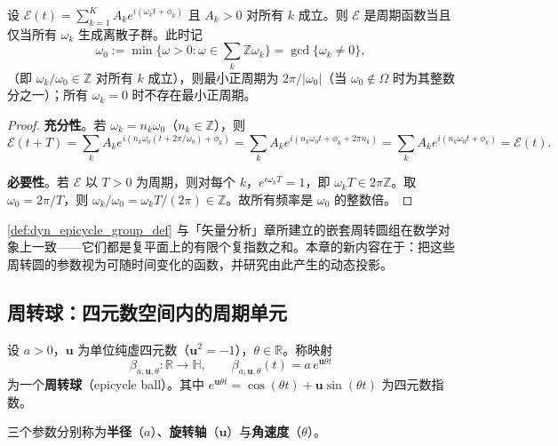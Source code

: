 \begin{proposition}[周转圆组的周期条件]\label{prop:dyn_epicycle_period_condition}
设 $\mathcal E(t)=\sum_{k=1}^{K}A_k e^{i(\omega_k t+\phi_k)}$ 且 $A_k>0$ 对所有 $k$ 成立。则 $\mathcal E$ 是周期函数当且仅当所有 $\omega_k$ 生成离散子群。此时记
\[
\omega_0:=\min\{\omega>0:\omega\in\textstyle\sum_k\mathbb{Z}\omega_k\}=\gcd\{\omega_k\ne0\},
\]
（即 $\omega_k/\omega_0\in\mathbb Z$ 对所有 $k$ 成立），则最小正周期为 $2\pi/\lvert\omega_0\rvert$（当 $\omega_0\notin\Omega$ 时为其整数分之一）；所有 $\omega_k=0$ 时不存在最小正周期。
\end{proposition}

\begin{proof}
\textbf{充分性}。若 $\omega_k=n_k\omega_0$（$n_k\in\mathbb Z$），则
\[
\mathcal E(t+T)=\sum_k A_k e^{i(n_k\omega_0(t+2\pi/\omega_0)+\phi_k)}
=\sum_k A_k e^{i(n_k\omega_0 t+\phi_k+2\pi n_k)}
=\sum_k A_k e^{i(n_k\omega_0 t+\phi_k)}=\mathcal E(t).
\]

\textbf{必要性}。若 $\mathcal E$ 以 $T>0$ 为周期，则对每个 $k$，$e^{i\omega_k T}=1$，即 $\omega_k T\in 2\pi\mathbb Z$。取 $\omega_0=2\pi/T$，则 $\omega_k/\omega_0=\omega_k T/(2\pi)\in\mathbb Z$。故所有频率是 $\omega_0$ 的整数倍。
\end{proof}

\begin{remark}[与静态模型的衔接]\label{rem:dyn_epicycle_static_link}
\cref{def:dyn_epicycle_group_def} 与「矢量分析」章所建立的嵌套周转圆组在数学对象上一致——它们都是复平面上的有限个复指数之和。本章的新内容在于：把这些周转圆的参数视为可随时间变化的函数，并研究由此产生的动态投影。
\end{remark}

\subsection{周转球：四元数空间内的周期单元}

\begin{definition}[周转球]\label{def:dyn_epicycle_ball}
设 $a>0$，$\mathbf u$ 为单位纯虚四元数（$\mathbf u^2=-1$），$\theta\in\mathbb R$。称映射
\[
\beta_{a,\mathbf u,\theta}:\mathbb R\to\mathbb H,\qquad
\beta_{a,\mathbf u,\theta}(t)=a\,e^{\mathbf u\theta t}
\]
为一个\textbf{周转球}（epicycle ball）。其中 $e^{\mathbf u\theta t}=\cos(\theta t)+\mathbf u\sin(\theta t)$ 为四元数指数。

三个参数分别称为\textbf{半径}（$a$）、\textbf{旋转轴}（$\mathbf u$）与\textbf{角速度}（$\theta$）。
\end{definition}

